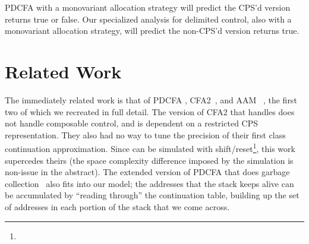 {\begin{SCodeFlow}
\begin{RktBlk}
\begin{SingleColumn}
\mbox{}\RktPn{(}\mbox{}\mbox{}\RktPn{(}\RktSym{$\lambda$}\mbox{}\RktPn{(}\RktPn{)}\mbox{}\RktPn{(}\mbox{}\mbox{}\RktPn{(}\RktSym{$\lambda$}\mbox{}\RktPn{(}\RktPn{)}\mbox{}\RktPn{(}\RktSym{$\le$}\mbox{}\mbox{}\RktPn{)}\RktPn{)}\RktPn{)}\RktPn{)}\RktPn{)}\RktPn{)}\end{SingleColumn}\end{RktBlk}\end{SCodeFlow}

PDCFA with a monovariant allocation strategy will predict the CPS'd version returns true or false.
%
Our specialized analysis for delimited control, also with a monovariant allocation strategy, will predict the non-CPS'd version returns true.}

\section{Related Work}

The immediately related work is that of PDCFA \citep{dvanhorn:Earl2010Pushdown}, CFA2~\citep{ianjohnson:vardoulakis-lmcs11, ianjohnson:Vardoulakis2011Pushdown}, and AAM ~\citep{dvanhorn:VanHorn2010Abstracting}, the first two of which we recreated in full detail.
%
The version of CFA2 that handles  does not handle composable control, and is dependent on a restricted CPS representation.
%
They also had no way to tune the precision of their first class continuation approximation.
%
Since  can be simulated with shift/reset\footnote{\RktPn{(}\mbox{}\RktPn{(}\mbox{}\RktPn{)}\mbox{}\RktPn{(}\mbox{}\mbox{}\RktPn{(}\mbox{}\RktPn{(}\mbox{}\RktPn{(}\RktSym{$\lambda$}\mbox{}\RktPn{(}\RktPn{)}\mbox{}\RktPn{(}\mbox{}\mbox{}\RktPn{(}\mbox{}\RktPn{)}\RktPn{)}\RktPn{)}\RktPn{)}\RktPn{)}\RktPn{)}\RktPn{)}}, this work supercedes theirs (the space complexity difference imposed by the simulation is non-issue in the abstract).
%
The extended version of PDCFA that does garbage collection~\citep{dvanhorn:Earl2012Introspective} also fits into our model;
the addresses that the stack keeps alive can be accumulated by ``reading through'' the continuation table, building up the set of addresses in each portion of the stack that we come across.

